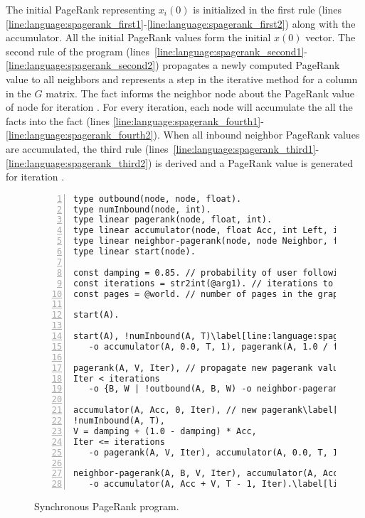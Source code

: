 The initial PageRank representing $x_i(0)$ is initialized in the first rule
(lines
\ref{line:language:spagerank_first1}-\ref{line:language:spagerank_first2}) along
with the accumulator. All the initial PageRank values form the initial $x(0)$
vector. The second rule of the program
(lines~\ref{line:language:spagerank_second1}-\ref{line:language:spagerank_second2})
propagates a newly computed PageRank value to all neighbors and represents a
step in the iterative method for a column in the $G$ matrix. The fact
 informs the neighbor node about the PageRank value of
node  for iteration . For every iteration, each node will
accumulate the all the  facts into the
 fact (lines
\ref{line:language:spagerank_fourth1}-\ref{line:language:spagerank_fourth2}).
When all inbound neighbor PageRank values are accumulated, the third rule
(lines~\ref{line:language:spagerank_third1}-\ref{line:language:spagerank_third2})
is derived and a PageRank value is generated for iteration .

\begin{figure}[h!]
\begin{Verbatim}[numbers=left,fontsize=\codesize,commandchars=\\\[\]]
type outbound(node, node, float).
type numInbound(node, int).
type linear pagerank(node, float, int).
type linear accumulator(node, float Acc, int Left, int Iteration).
type linear neighbor-pagerank(node, node Neighbor, float Rank, int Iteration).
type linear start(node).

const damping = 0.85. // probability of user following a link in the current page.\label[line:language:spagerank_const1]
const iterations = str2int(@arg1). // iterations to compute.
const pages = @world. // number of pages in the graph.\label[line:language:spagerank_const2]

start(A).

start(A), !numInbound(A, T)\label[line:language:spagerank_first1]
   -o accumulator(A, 0.0, T, 1), pagerank(A, 1.0 / float(pages), 0).\label[line:language:spagerank_first2]

pagerank(A, V, Iter), // propagate new pagerank value\label[line:language:spagerank_second1]
Iter < iterations
   -o {B, W | !outbound(A, B, W) -o neighbor-pagerank(B, A, V * W, Iter + 1)}.\label[line:language:spagerank_second2]

accumulator(A, Acc, 0, Iter), // new pagerank\label[line:language:spagerank_third1]
!numInbound(A, T),
V = damping + (1.0 - damping) * Acc,
Iter <= iterations
   -o pagerank(A, V, Iter), accumulator(A, 0.0, T, Iter + 1).\label[line:language:spagerank_third2]
	
neighbor-pagerank(A, B, V, Iter), accumulator(A, Acc, T, Iter)\label[line:language:spagerank_fourth1]
   -o accumulator(A, Acc + V, T - 1, Iter).\label[line:language:spagerank_fourth2]
\end{Verbatim}
\caption{Synchronous PageRank program.}
\label{language:code:pagerank}
\end{figure}

